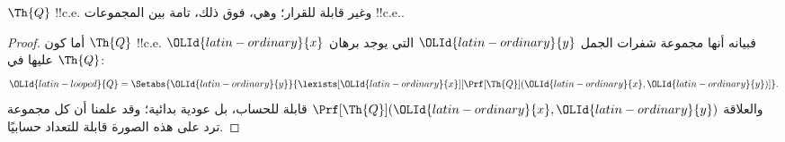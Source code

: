 \documentclass[../../../include/open-logic-section]{subfiles}
\begin{document}



\begin{thm}
$\Th{Q}$ !!{c.e.} وغير قابلة للقرار؛ وهي، فوق ذلك، تامة بين المجموعات
!!{c.e.}.
\end{thm}

\begin{proof}
أما كون $\Th{Q}$ !!{c.e.} فبيانه أنها مجموعة شفرات الجمل
${\OLId{latin-ordinary}{y}}$ التي يوجد برهان ${\OLId{latin-ordinary}{x}}$ عليها في $\Th{Q}$:
\[
{\OLId{latin-looped}{Q}} = \Setabs{{\OLId{latin-ordinary}{y}}}{\lexists[{\OLId{latin-ordinary}{x}}][\Prf[\Th{Q}]({\OLId{latin-ordinary}{x}},{\OLId{latin-ordinary}{y}})]}.
\]
والعلاقة $\Prf[\Th{Q}]({\OLId{latin-ordinary}{x}},{\OLId{latin-ordinary}{y}})$ قابلة للحساب، بل عودية بدائية؛ وقد
علمنا أن كل مجموعة ترد على هذه الصورة قابلة للتعداد حسابيًا.


\end{proof}
\end{document}
